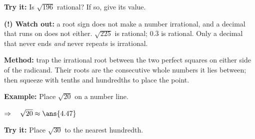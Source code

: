 \documentclass[12pt]{article}
\begin{document}
\begin{tryitbox}
\textbf{Try it:} \quad Is $\sqrt{196}$ rational? If so, give its value.\\[2pt]
\end{tryitbox}

\begin{watchoutbox}
\textbf{(!) Watch out:} a root sign does not make a number irrational, and a decimal that
runs on does not either. $\sqrt{225}$ is rational; $0.\overline{3}$ is rational. Only a
decimal that never ends \emph{and} never repeats is irrational.
\end{watchoutbox}


\begin{formulabox}
\textbf{Method:} trap the irrational root between the two perfect squares on either side
of the radicand. Their roots are the consecutive whole numbers it lies between; then
squeeze with tenths and hundredths to place the point.
\end{formulabox}

\begin{examplebox}
\textbf{Example:} \quad Place $\sqrt{20}$ on a number line.

$\Rightarrow\quad \sqrt{20} \approx \ans{4.47}$
\end{examplebox}

\begin{tryitbox}
\textbf{Try it:} \quad Place $\sqrt{30}$ to the nearest hundredth.\\[2pt]
\end{tryitbox}
\end{document}
